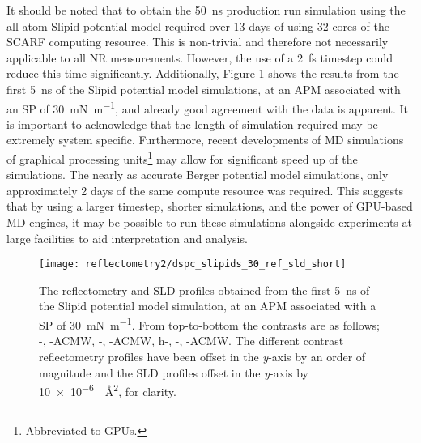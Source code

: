 It should be noted that to obtain the \SI{50}{\nano\second} production run simulation using the all-atom Slipid potential model required over 13 days of using 32 cores of the SCARF computing resource.
This is non-trivial and therefore not necessarily applicable to all NR measurements.
However, the use of a \SI{2}{\femto\second} timestep could reduce this time significantly.
Additionally, Figure \ref{fig:short} shows the results from the first \SI{5}{\nano\second} of the Slipid potential model simulations, at an APM associated with an SP of \SI{30}{\milli\newton\per\meter}, and already good agreement with the data is apparent.
It is important to acknowledge that the length of simulation required may be extremely system specific.
Furthermore, recent developments of MD simulations of graphical processing units\footnote{Abbreviated to GPUs.} may allow for significant speed up of the simulations.
The nearly as accurate Berger potential model simulations, only approximately 2 days of the same compute resource was required.
This suggests that by using a larger timestep, shorter simulations, and the power of GPU-based MD engines, it may be possible to run these simulations alongside experiments at large facilities to aid interpretation and analysis.
%
\begin{figure}[t]
    \forcerectofloat
    \centering
    \texttt{[image: reflectometry2/dspc\_slipids\_30\_ref\_sld\_short]}
    \caption{The reflectometry and SLD profiles obtained from the first \SI{5}{\nano\second} of the Slipid potential model simulation, at an APM associated with a SP of \SI{30}{\milli\newton\per\meter}. From top-to-bottom the contrasts are as follows; -, -ACMW, -, -ACMW, h-, -, -ACMW. The different contrast reflectometry profiles have been offset in the \emph{y}-axis by an order of magnitude and the SLD profiles offset in the \emph{y}-axis by \SI{10e-6}{\per\square\angstrom}, for clarity.}
    \label{fig:short}
\end{figure}
%

